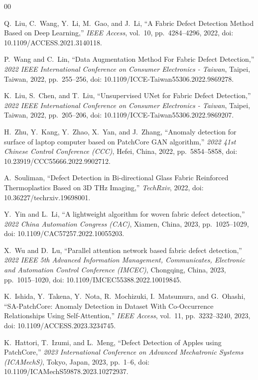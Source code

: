 \documentclass{ieeeaccess}
\begin{document}
\begin{thebibliography}{00}

 Q.~Liu, C.~Wang, Y.~Li, M.~Gao, and J.~Li, ``A Fabric Defect Detection Method Based on Deep Learning,'' \textit{IEEE Access}, vol.~10, pp.~4284--4296, 2022, doi: 10.1109/ACCESS.2021.3140118.

 P.~Wang and C.~Lin, ``Data Augmentation Method For Fabric Defect Detection,'' \textit{2022 IEEE International Conference on Consumer Electronics - Taiwan}, Taipei, Taiwan, 2022, pp.~255--256, doi: 10.1109/ICCE-Taiwan55306.2022.9869278.

 K.~Liu, S.~Chen, and T.~Liu, ``Unsupervised UNet for Fabric Defect Detection,'' \textit{2022 IEEE International Conference on Consumer Electronics - Taiwan}, Taipei, Taiwan, 2022, pp.~205--206, doi: 10.1109/ICCE-Taiwan55306.2022.9869207.

 H.~Zhu, Y.~Kang, Y.~Zhao, X.~Yan, and J.~Zhang, ``Anomaly detection for surface of laptop computer based on PatchCore GAN algorithm,'' \textit{2022 41st Chinese Control Conference (CCC)}, Hefei, China, 2022, pp.~5854--5858, doi: 10.23919/CCC55666.2022.9902712.

 A.~Souliman, ``Defect Detection in Bi-directional Glass Fabric Reinforced Thermoplastics Based on 3D THz Imaging,'' \textit{TechRxiv}, 2022, doi: 10.36227/techrxiv.19698001.

 Y.~Yin and L.~Li, ``A lightweight algorithm for woven fabric defect detection,'' \textit{2022 China Automation Congress (CAC)}, Xiamen, China, 2023, pp.~1025--1029, doi: 10.1109/CAC57257.2022.10055203.

 X.~Wu and D.~Lu, ``Parallel attention network based fabric defect detection,'' \textit{2022 IEEE 5th Advanced Information Management, Communicates, Electronic and Automation Control Conference (IMCEC)}, Chongqing, China, 2023, pp.~1015--1020, doi: 10.1109/IMCEC55388.2022.10019845.

 K.~Ishida, Y.~Takena, Y.~Nota, R.~Mochizuki, I.~Matsumura, and G.~Ohashi, ``SA-PatchCore: Anomaly Detection in Dataset With Co-Occurrence Relationships Using Self-Attention,'' \textit{IEEE Access}, vol.~11, pp.~3232--3240, 2023, doi: 10.1109/ACCESS.2023.3234745.

 K.~Hattori, T.~Izumi, and L.~Meng, ``Defect Detection of Apples using PatchCore,'' \textit{2023 International Conference on Advanced Mechatronic Systems (ICAMechS)}, Tokyo, Japan, 2023, pp.~1--6, doi: 10.1109/ICAMechS59878.2023.10272937.


\end{thebibliography}
\end{document}
